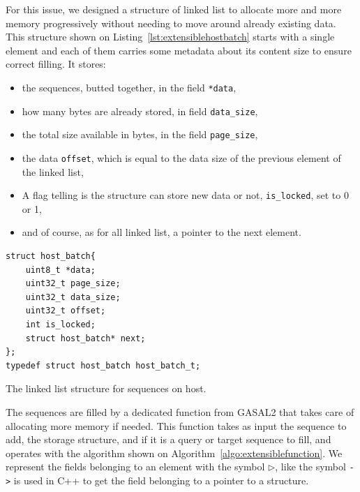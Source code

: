 For this issue, we designed a structure of linked list to allocate more and more memory progressively without needing to move around already existing data. This structure shown on Listing~\ref{lst:extensiblehostbatch} starts with a single element and each of them carries some metadata about its content size to ensure correct filling. It stores:

\begin{itemize}
	\item the sequences, butted together, in the field \verb|*data|,
	\item how many bytes are already stored, in field \verb|data_size|,
	\item the total size available in bytes, in the field \verb|page_size|,
	\item the data \verb|offset|, which is equal to the data size of the previous element of the linked list,
	\item A flag telling is the structure can store new data or not, \verb|is_locked|, set to 0 or 1,
	\item and of course, as for all linked list, a pointer to the next element.
\end{itemize}

\begin{listing}[h!]
	\begin{verbatim}
struct host_batch{
	uint8_t *data;
	uint32_t page_size;
	uint32_t data_size;
	uint32_t offset;
	int is_locked;
	struct host_batch* next;
};
typedef struct host_batch host_batch_t;
	\end{verbatim}
\caption{The linked list structure for sequences on host.}
\label{lst:extensiblehostbatch}
\end{listing}

The sequences are filled by a dedicated function from GASAL2 that takes care of allocating more memory if needed. This function takes as input the sequence to add, the storage structure, and if it is a query or target sequence to fill, and operates with the algorithm shown on Algorithm~\ref{algo:extensiblefunction}. We represent the fields belonging to an element with the symbol $\rhd$, like the symbol \verb|->| is used in C++ to get the field belonging to a pointer to a structure.



